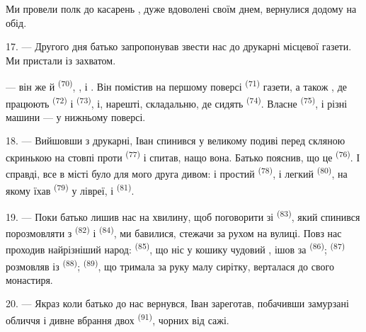 Ми провели полк до касарень , дуже вдоволені своїм днем, вернулися
додому на обід.

\VUsaut{3.0mm}

17. --- Другого дня батько запропонував звести нас до друкарні місцевої газети.
Ми пристали із захватом.

 --- він же й  \textsuperscript{(70)},
,  і . Він помістив на
першому поверсі  \textsuperscript{(71)} газети, а також
, де працюють  \textsuperscript{(72)} і
 \textsuperscript{(73)}, і, нарешті, складальню, де сидять
 \textsuperscript{(74)}. Власне 
\textsuperscript{(75)},  і різні машини --- у нижньому
поверсі.

\VUsaut{3.0mm}

18. --- Вийшовши з друкарні, Іван спинився у великому подиві перед скляною
скринькою на стовпі проти  \textsuperscript{(77)}
і спитав, нащо вона. Батько пояснив, що це 
\textsuperscript{(76)}. І справді, все в місті було для мого друга дивом: і
простий  \textsuperscript{(78)}, і легкий
 \textsuperscript{(80)}, на якому їхав
 \textsuperscript{(79)} у лівреї, і 
\textsuperscript{(81)}.

19. --- Поки батько лишив нас на хвилину, щоб поговорити зі  \textsuperscript{(83)}, який спинився порозмовляти з
 \textsuperscript{(82)} і 
\textsuperscript{(84)}, ми бавилися, стежачи за рухом на вулиці. Повз нас
проходив найрізніший народ:  \textsuperscript{(85)},
що ніс у кошику чудовий , ішов за 
\textsuperscript{(86)};  \textsuperscript{(87)} розмовляв із
 \textsuperscript{(88)}; 
\textsuperscript{(89)}, що тримала за руку малу сирітку, верталася до свого
монастиря.

\VUsaut{3.0mm}

20. --- Якраз коли батько до нас вернувся, Іван зареготав, побачивши замурзані
обличчя і дивне вбрання двох  \textsuperscript{(91)}, чорних
від сажі.

